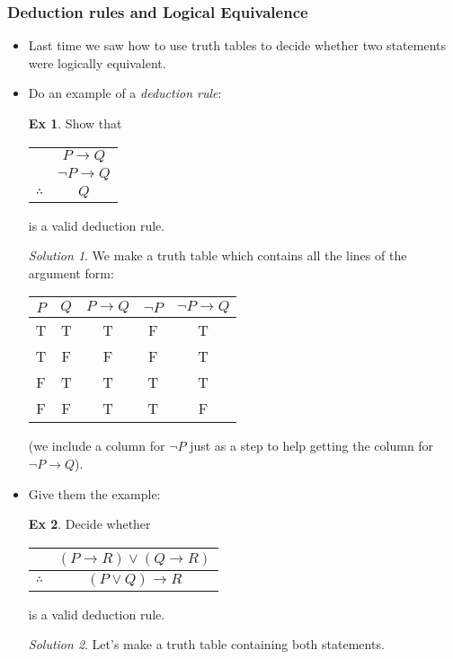 \documentclass[12pt]{article}
\theoremstyle{plain}
\theoremstyle{definition}
\newtheorem*{example}{Ex}
\theoremstyle{remark}
\newtheorem*{solution}{Solution}
\def\imp{\rightarrow}
\newcommand{\todayis}[1]{\clearpage{\rhead{\footnotesize #1}}}
\begin{document}
\todayis{Friday, October 28}

\subsubsection*{Deduction rules and Logical Equivalence}

\begin{itemize}
\item Last time we saw how to use truth tables to decide whether two statements were logically equivalent.

\item Do an example of a \emph{deduction rule}:
\begin{example}
  Show that
  \begin{center}
    \begin{tabular}{rc}
      & $P \imp Q$\\
      & $\neg P \imp Q$ \\ \hline
      $\therefore$ & $Q$
    \end{tabular}
  \end{center}
  is a valid deduction rule.

  \begin{solution}
    We make a truth table which contains all the lines of the argument form:
    \begin{center}
      \begin{tabular}{c|c||c|c|c}
        $P$ & $Q$ & $P\imp Q$ & $\neg P$ & $\neg P \imp Q$ \\ \hline
        T & T & T & F & T \\
        T & F & F & F & T \\
        F & T & T & T & T \\
        F & F & T & T & F
      \end{tabular}
    \end{center}
    (we include a column for $\neg P$ just as a step to help getting the column for $\neg P \imp Q$).
  \end{solution}
\end{example}

\item Give them the example:
\begin{example}
  Decide whether
  \begin{center}
    \begin{tabular}{rc}
      &  $(P \imp R) \vee (Q \imp R)$ \\ \hline
      $\therefore$  & $(P \vee Q) \imp R$
    \end{tabular}
  \end{center}
  is a valid deduction rule.
  \begin{solution}
    Let's make a truth table containing both statements.


\end{solution}
\end{example}
\end{itemize}
\end{document}
